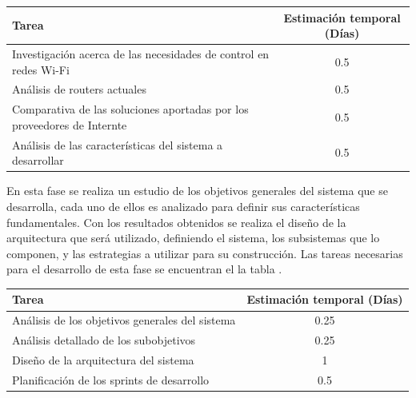 \documentclass[12pt]{article}
\begin{document}
            \begin{tabular}{|l|c|}
                \hline
                \textbf{Tarea}                                                              &   \textbf{Estimación temporal} (Días) \\           
                \hline
                Investigación acerca de las necesidades de control en redes Wi-Fi           &   0.5                                 \\
                Análisis de routers actuales                                                &   0.5                                 \\
                Comparativa de las soluciones aportadas por los proveedores de Internte     &   0.5                                 \\
                Análisis de las características del sistema a desarrollar                   &   0.5                                 \\
                \hline
            \end{tabular}

            En esta fase se realiza un estudio de los objetivos generales del sistema que se desarrolla, cada uno de ellos es analizado para definir sus características fundamentales. Con los resultados obtenidos se realiza el diseño de la arquitectura que será utilizado, definiendo el sistema, los subsistemas que lo componen, y las estrategias a utilizar para su construcción. Las tareas necesarias para el desarrollo de esta fase se encuentran el la tabla .

            \begin{tabular}{|l|c|}
                \hline
                \textbf{Tarea}                                                              &   \textbf{Estimación temporal} (Días) \\           
                \hline
                Análisis de los objetivos generales del sistema                             &   0.25                                \\
                Análisis detallado de los subobjetivos                                      &   0.25                                \\
                Diseño de la arquitectura del sistema                                       &   1                                   \\
                Planificación de los sprints de desarrollo                                  &   0.5                                 \\
                \hline
            \end{tabular}
            
\end{document}
